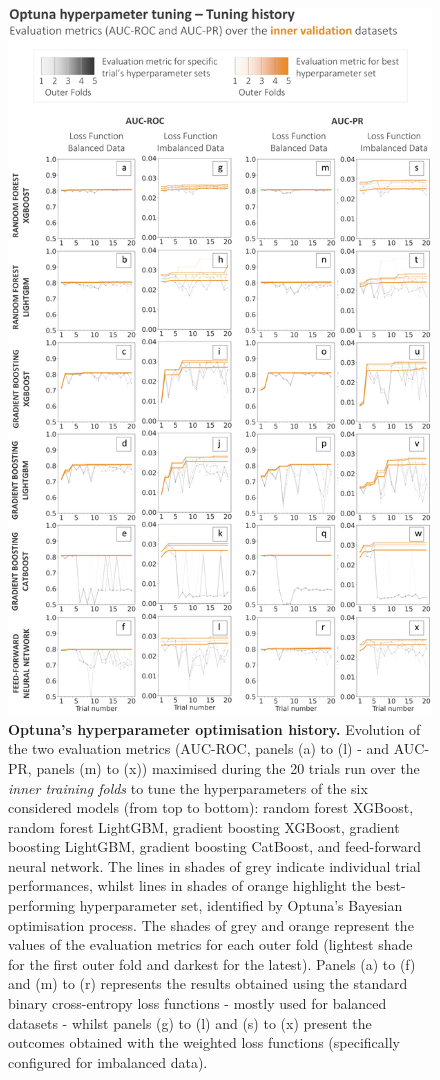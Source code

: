 \begin{figure}[htbp]
\centering
\includegraphics[width=\textwidth]{optuna_history.png}
\caption{\textbf{Optuna's hyperparameter optimisation history.} Evolution of the two evaluation metrics (AUC-ROC, panels (a) to (l) - and AUC-PR, panels (m) to (x)) maximised during the 20 trials run over the \textcolor{colourInnerTraining}{\textit{inner training folds}} to tune the hyperparameters of the six considered models (from top to bottom): random forest XGBoost, random forest LightGBM, gradient boosting XGBoost, gradient boosting LightGBM, gradient boosting CatBoost, and feed-forward neural network. The lines in shades of grey indicate individual trial performances, whilst lines in shades of orange highlight the best-performing hyperparameter set, identified by Optuna's Bayesian optimisation process. The shades of grey and orange represent the values of the evaluation metrics for each outer fold (lightest shade for the first outer fold and darkest for the latest). Panels (a) to (f) and (m) to (r) represents the results obtained using the standard binary cross-entropy loss functions - mostly used for balanced datasets - whilst panels (g) to (l) and (s) to (x) present the outcomes obtained with the weighted loss functions (specifically configured for imbalanced data).}

\end{figure}

